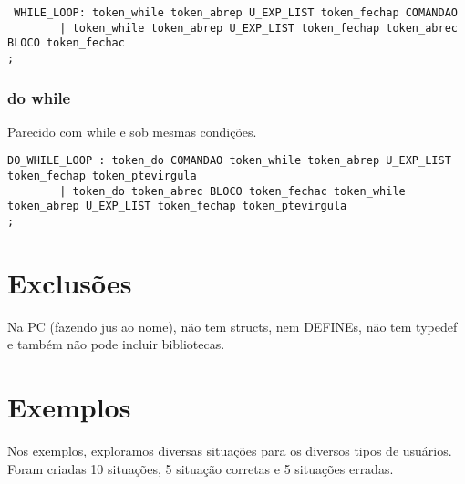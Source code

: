\documentclass[a4paper,10pt]{article}
\begin{document}
\begin{verbatim}
 WHILE_LOOP: token_while token_abrep U_EXP_LIST token_fechap COMANDAO
	    | token_while token_abrep U_EXP_LIST token_fechap token_abrec BLOCO token_fechac
;
\end{verbatim}

\subsubsection{do while}

Parecido com while e sob mesmas condições.

\begin{verbatim}
DO_WHILE_LOOP : token_do COMANDAO token_while token_abrep U_EXP_LIST token_fechap token_ptevirgula
		| token_do token_abrec BLOCO token_fechac token_while token_abrep U_EXP_LIST token_fechap token_ptevirgula
;

\end{verbatim}

\section{Exclusões}
Na PC (fazendo jus ao nome), não tem structs, nem DEFINEs, não tem typedef e também não pode incluir bibliotecas.

\section{Exemplos}
Nos exemplos, exploramos diversas situações para os diversos tipos de usuários. Foram criadas 10 situações, 5 situação corretas e 5 
situações erradas.
\end{document}
